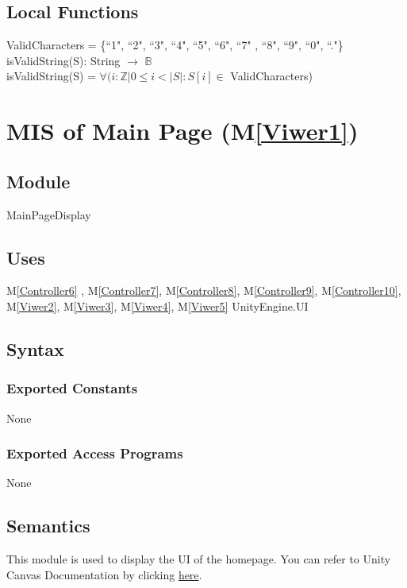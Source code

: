 \documentclass[12pt, titlepage]{article}
\newcommand{\mref}[1]{M\ref{#1}}
\begin{document}
\subsection{Local Functions}
ValidCharacters = \{``1", ``2", ``3", ``4", ``5", ``6", ``7"
, ``8", ``9", ``0", ``."\}\\

\noindent isValidString(S): String $\rightarrow$ $\mathbb{B}$ \\

\noindent isValidString(S) = $\forall(i : \mathbb{Z} | 0 \leq
i < |S| : S[i] \in $ ValidCharacters)


\newpage

\section{MIS of Main Page (\mref{Viwer1})}

\subsection{Module}
MainPageDisplay

\subsection{Uses}
\mref{Controller6} , \mref{Controller7}, \mref{Controller8}, \mref{Controller9}, \mref{Controller10}, \mref{Viwer2}, \mref{Viwer3}, \mref{Viwer4}, \mref{Viwer5}
UnityEngine.UI

\subsection{Syntax}
\subsubsection{Exported Constants}
None
\subsubsection{Exported Access Programs}
None

\subsection{Semantics}
This module is used to display the UI of the homepage.  You can refer to Unity Canvas Documentation by clicking \href{https://docs.unity3d.com/Packages/com.unity.ugui@1.0/manual/class-Canvas.html}{here}.
\end{document}
